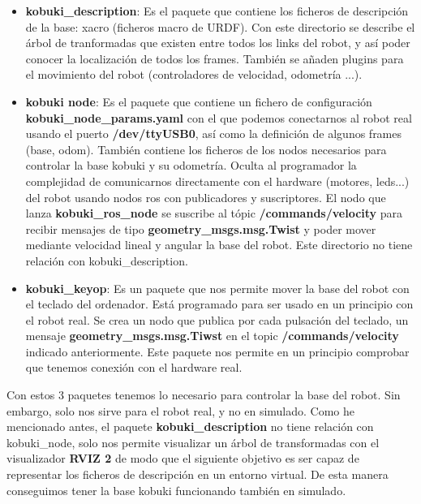 \begin{itemize}
	\item \textbf{kobuki\_description}: Es el paquete que contiene los ficheros de descripción de la base: xacro (ficheros macro de URDF). Con este directorio se describe el árbol de tranformadas que existen entre todos los links del robot, y así poder conocer la localización de todos los frames. También se añaden plugins para el movimiento del robot (controladores de velocidad, odometría ...).
	\item \textbf{kobuki node}: Es el paquete que contiene un fichero de configuración \textbf{kobuki\_node\_params.yaml} con el que podemos conectarnos al robot real usando el puerto \textbf{/dev/ttyUSB0}, así como la definición de algunos frames (base, odom). También contiene los ficheros de los nodos necesarios para controlar la base kobuki y su odometría. Oculta al programador la complejidad de comunicarnos directamente con el hardware (motores, leds...) del robot usando nodos ros con publicadores y suscriptores. El nodo que lanza \textbf{kobuki\_ros\_node} se suscribe al tópic \textbf{/commands/velocity} para recibir mensajes de tipo \textbf{geometry\_msgs.msg.Twist} y poder mover mediante velocidad lineal y angular la base del robot. Este directorio no tiene relación con kobuki\_description.
	\item \textbf{kobuki\_keyop}: Es un paquete que nos permite mover la base del robot con el teclado del ordenador. Está programado para ser usado en un principio con el robot real. Se crea un nodo que publica por cada pulsación del teclado, un mensaje \textbf{geometry\_msgs.msg.Tiwst} en el topic \textbf{/commands/velocity} indicado anteriormente. Este paquete nos permite en un principio comprobar que tenemos conexión con el hardware real.
\end{itemize}

Con estos 3 paquetes tenemos lo necesario para controlar la base del robot. Sin embargo, solo nos sirve para el robot real, y no en simulado. Como he mencionado antes, el paquete \textbf{kobuki\_description} no tiene relación con kobuki\_node, solo nos permite visualizar un árbol de transformadas con el visualizador \textbf{RVIZ 2} de modo que el siguiente objetivo es ser capaz de representar los ficheros de descripción en un entorno virtual. De esta manera conseguimos tener la base kobuki funcionando también en simulado.





